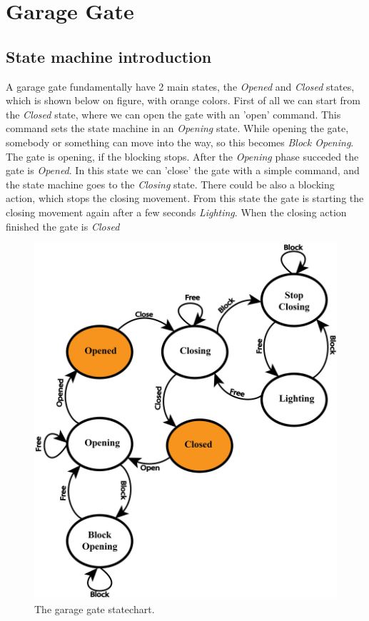 \chapter{Garage Gate}\label{sect:garage-statechart}
\section{State machine introduction}

A garage gate fundamentally have 2 main states, the \textit{Opened} and \textit{Closed} states, which is shown below on  figure, with orange colors. First of all we can start from the \textit{Closed} state, where we can open the gate with an 'open' command. This command sets the state machine in an \textit{Opening} state. While opening the gate, somebody or something can move into the way, so this becomes \textit{Block Opening}. The gate is opening, if the blocking stops. After the \textit{Opening} phase succeded the gate is \textit{Opened}. In this state we can 'close' the gate with a simple command, and the state machine goes to the \textit{Closing} state. There could be also a blocking action, which stops the closing movement. From this state the gate is starting the closing movement again after a few seconds \textit{Lighting}. When the closing action finished the gate is \textit{Closed}

\begin{figure}[!ht]
\centering
\includegraphics[width=150mm, keepaspectratio]{figures/garage.png}
\caption{The garage gate statechart.}
\label{fig:Garage Statechart}
\end{figure}
